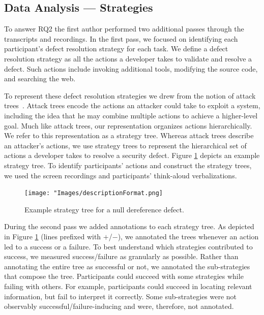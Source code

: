 \documentclass[10pt,journal,compsoc]{IEEEtran}
\begin{document}
\subsection{Data Analysis --- Strategies}
\label{sec:strategyAnalysis}
To answer RQ2 the first author performed two additional passes through the transcripts and recordings. 
In the first pass, we focused on identifying each participant's defect resolution strategy for each task. 
We define a defect resolution strategy as all the actions a developer takes to validate and resolve a defect. 
Such actions include invoking additional tools, modifying the source code, and searching the web.

To represent these defect resolution strategies we drew from the notion of attack trees~\cite{attackTrees}. 
Attack trees encode the actions an attacker could take to exploit a system, including the idea that he may combine multiple actions to achieve a higher-level goal. 
Much like attack trees, our representation organizes actions hierarchically.
We refer to this representation as a strategy tree.
Whereas attack trees describe an attacker's actions, we use strategy trees to represent the hierarchical set of actions a developer takes to resolve a security defect. 
Figure \ref{fig:description} depicts an example strategy tree.
To identify participants' actions and construct the strategy trees, we used the screen recordings and participants' think-aloud verbalizations. 

\begin{figure}
	\centering
	\texttt{[image: "Images/descriptionFormat.png]}
	\caption{Example strategy tree for a null dereference defect. }
	\label{fig:description} 
\end{figure}



During the second pass we added annotations to each strategy tree. 
As depicted in Figure \ref{fig:description} (lines prefixed with $+$/$-$), we annotated the trees whenever an action led to a success or a failure. 
To best understand which strategies contributed to success, we measured success/failure as granularly as possible.
Rather than annotating the entire tree as successful or not, we annotated the sub-strategies that compose the tree.
Participants could succeed with some strategies while failing with others.
For example, participants could succeed in locating relevant information, but fail to interpret it correctly. 
Some sub-strategies were not observably successful/failure-inducing and were, therefore, not annotated. 
\end{document}
